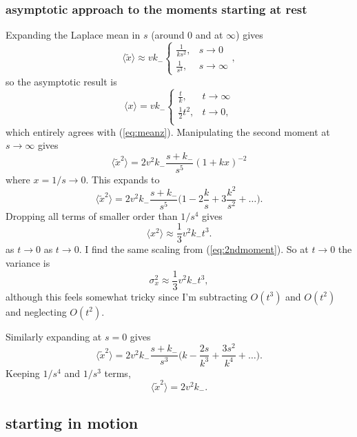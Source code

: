 \documentclass[11pt]{article}
\newcommand\be{\begin{equation}} %
\newcommand\ee{\end{equation}}   %
\newcommand\bra{\langle}
\newcommand\ket{\rangle}
\begin{document}
\subsubsection{asymptotic approach to the moments starting at rest}
Expanding the Laplace mean in $s$ (around $0$ and at $\infty$) gives
\be
\bra \tilde{x}\ket \approx v k_- 
\begin{cases}
	\frac{1}{ks^2}, & s \rightarrow 0\\
	\frac{1}{s^3}, & s \rightarrow \infty
\end{cases},
\ee
so the asymptotic result is 
\be \bra x \ket = v k_-
\begin{cases}
	\frac{t}{k}, & t \rightarrow \infty \\
	\frac{1}{2} t^2, & t \rightarrow 0,\\
\end{cases}
\ee
which entirely agrees with (\ref{eq:meanz}).
Manipulating the second moment at $s \rightarrow \infty$ gives
\be \bra \tilde{x}^2 \ket = 2v^2k_-\frac{s+ k_-}{s^5}(1+kx)^{-2} \ee
where $x = 1/s \rightarrow 0$.
This expands to 
\be \bra \tilde{x}^2 \ket = 2v^2 k_-\frac{s+ k_-}{s^5} \Big( 1 - 2\frac{k}{s} + 3 \frac{k^2}{s^2}+ \dots\Big).\ee
Dropping all terms of smaller order than $1/s^4$ gives
\be \bra x^2 \ket \approx \frac{1}{3}v^2 k_- t^3.\ee as $t \rightarrow 0$
as $t \rightarrow 0$. I find the same scaling from (\ref{eq:2ndmoment}).
So at $t \rightarrow 0$ the variance is 
\be \sigma_x^2 \approx \frac{1}{3}v^2 k_- t^3,\ee
although this feels somewhat tricky since I'm subtracting $O(t^3)$ and $O(t^2)$ and neglecting $O(t^2)$. 

Similarly expanding at $s=0$ gives
\be \bra \tilde{x}^2 \ket = 2v^2 k_- \frac{s + k_-}{s^3}\Big( k - \frac{2s}{k^3} + \frac{3s^2}{k^4} + \dots \Big) .\ee
Keeping $1/s^4$ and $1/s^3$ terms, 
\be \bra \tilde{x}^2 \ket = 2v^2 k_-  .\ee

\subsection{starting in motion}
\end{document}
